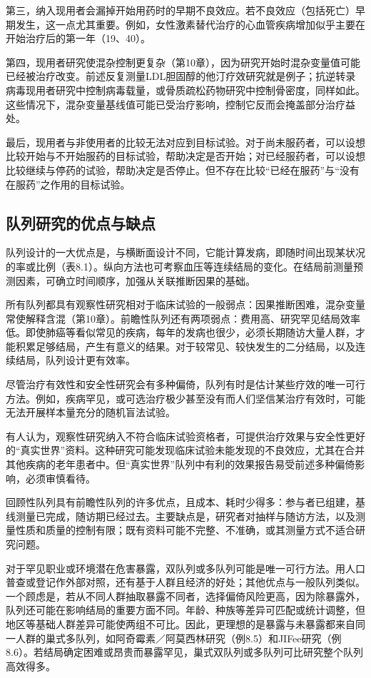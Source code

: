 第三，纳入现用者会漏掉开始用药时的早期不良效应。若不良效应（包括死亡）早期发生，这一点尤其重要。例如，女性激素替代治疗的心血管疾病增加似乎主要在开始治疗后的第一年（19、40）。

第四，现用者研究使混杂控制更复杂（第10章），因为研究开始时混杂变量值可能已经被治疗改变。前述反复测量LDL胆固醇的他汀疗效研究就是例子；抗逆转录病毒现用者研究中控制病毒载量，或骨质疏松药物研究中控制骨密度，同样如此。这些情况下，混杂变量基线值可能已受治疗影响，控制它反而会掩盖部分治疗益处。

最后，现用者与非使用者的比较无法对应到目标试验。对于尚未服药者，可以设想比较开始与不开始服药的目标试验，帮助决定是否开始；对已经服药者，可以设想比较继续与停药的试验，帮助决定是否停止。但不存在比较“已经在服药”与“没有在服药”之作用的目标试验。

\subsection{队列研究的优点与缺点}
队列设计的一大优点是，与横断面设计不同，它能计算发病，即随时间出现某状况的率或比例（表8.1）。纵向方法也可考察血压等连续结局的变化。在结局前测量预测因素，可确立时间顺序，加强从关联推断因果的基础。

所有队列都具有观察性研究相对于临床试验的一般弱点：因果推断困难，混杂变量常使解释含混（第10章）。前瞻性队列还有两项弱点：费用高、研究罕见结局效率低。即使肺癌等看似常见的疾病，每年的发病也很少，必须长期随访大量人群，才能积累足够结局，产生有意义的结果。对于较常见、较快发生的二分结局，以及连续结局，队列设计更有效率。

尽管治疗有效性和安全性研究会有多种偏倚，队列有时是估计某些疗效的唯一可行方法。例如，疾病罕见，或可选治疗极少甚至没有而人们坚信某治疗有效时，可能无法开展样本量充分的随机盲法试验。

有人认为，观察性研究纳入不符合临床试验资格者，可提供治疗效果与安全性更好的“真实世界”资料。这种研究可能发现临床试验未能发现的不良效应，尤其在合并其他疾病的老年患者中。但“真实世界”队列中有利的效果报告易受前述多种偏倚影响，必须审慎看待。

回顾性队列具有前瞻性队列的许多优点，且成本、耗时少得多：参与者已组建，基线测量已完成，随访期已经过去。主要缺点是，研究者对抽样与随访方法，以及测量性质和质量的控制有限；既有资料可能不完整、不准确，或其测量方式不适合研究问题。

对于罕见职业或环境潜在危害暴露，双队列或多队列可能是唯一可行方法。用人口普查或登记作外部对照，还有基于人群且经济的好处；其他优点与一般队列类似。一个顾虑是，若从不同人群抽取暴露不同者，选择偏倚风险更高，因为除暴露外，队列还可能在影响结局的重要方面不同。年龄、种族等差异可匹配或统计调整，但地区等基础人群差异可能使两组不可比。因此，更理想的是暴露与未暴露都来自同一人群的巢式多队列，如阿奇霉素／阿莫西林研究（例8.5）和JIFee研究（例8.6）。若结局确定困难或昂贵而暴露罕见，巢式双队列或多队列可比研究整个队列高效得多。

